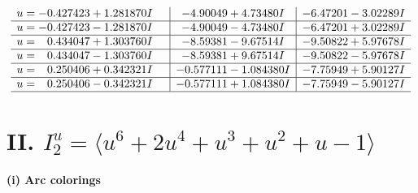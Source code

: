 \documentclass[1p]{elsarticle_modified}
\theoremstyle{definition}
\begin{document}
$$\begin{array}{c|c|c}
\begin{aligned}
u &= -0.427423 + 1.281870 I\end{aligned}
 & -4.90049 + 4.73480 I & -6.47201 - 3.02289 I \\ \hline\begin{aligned}
u &= -0.427423 - 1.281870 I\end{aligned}
 & -4.90049 - 4.73480 I & -6.47201 + 3.02289 I \\ \hline\begin{aligned}
u &= \phantom{-}0.434047 + 1.303760 I\end{aligned}
 & -8.59381 - 9.67514 I & -9.50822 + 5.97678 I \\ \hline\begin{aligned}
u &= \phantom{-}0.434047 - 1.303760 I\end{aligned}
 & -8.59381 + 9.67514 I & -9.50822 - 5.97678 I \\ \hline\begin{aligned}
u &= \phantom{-}0.250406 + 0.342321 I\end{aligned}
 & -0.577111 - 1.084380 I & -7.75949 + 5.90127 I \\ \hline\begin{aligned}
u &= \phantom{-}0.250406 - 0.342321 I\end{aligned}
 & -0.577111 + 1.084380 I & -7.75949 - 5.90127 I\\
 \hline 
 \end{array}$$\newpage\newpage\renewcommand{\arraystretch}{1}
\centering \section*{II. $I^u_{2}= \langle u^6+2 u^4+u^3+u^2+u-1 \rangle$}
\flushleft \textbf{(i) Arc colorings}\\
\end{document}
